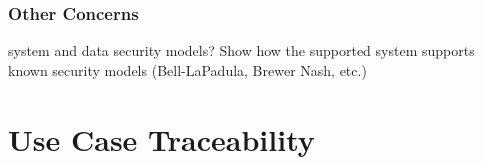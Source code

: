 \documentclass[t,handout]{beamer}
\begin{document}
\begin{frame}
\frametitle{Other Concerns}
system and data security models? Show how the supported system supports known security models (Bell-LaPadula, Brewer Nash, etc.)
\end{frame}

\section{Use Case Traceability}

\end{document}
